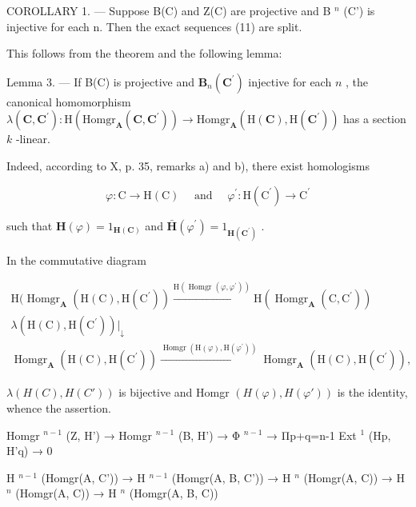 COROLLARY 1. --- Suppose B(C) and Z(C) are projective and B \(^{n}\) (C') is injective for each n. Then the exact sequences (11) are split.

This follows from the theorem and the following lemma:

Lemma 3. --- If B(C) is projective and \(\mathbf{B}_{n}(\mathbf{C}^{\prime})\) injective for each \(n\) , the canonical homomorphism \(\lambda(\mathbf{C}, \mathbf{C}^{\prime}): \mathrm{H}(\mathrm{Homgr}_{\mathbf{A}}(\mathbf{C}, \mathbf{C}^{\prime})) \to \mathrm{Homgr}_{\mathbf{A}}(\mathrm{H}(\mathbf{C}), \mathrm{H}(\mathbf{C}^{\prime}))\) has a section \(k\) -linear.

Indeed, according to X, p. 35, remarks a) and b), there exist homologisms

\[
\varphi : \mathrm{C} \rightarrow \mathrm{H} (\mathrm{C}) \quad \text { and } \quad \varphi^ {\prime}: \mathrm{H} (\mathrm{C} ^ {\prime}) \rightarrow \mathrm{C} ^ {\prime}
\]

such that \(\mathbf{H}(\varphi) = 1_{\mathbf{H}(\mathbf{C})}\) and \(\bar{\mathbf{H}} (\varphi^{\prime}) = 1_{\mathbf{H}(\mathbf{C}^{\prime})}\) .

In the commutative diagram

\[
\begin{array}{l} \mathrm{H} (\operatorname{Homgr} _ {\mathbf {A}} (\mathrm{H} (\mathrm{C}), \mathrm{H} (\mathrm{C} ^ {\prime})) \xrightarrow {\mathrm{H} (\operatorname{Homgr} (\varphi , \varphi^ {\prime}))} \mathrm{H} (\operatorname{Homgr} _ {\mathbf {A}} (\mathrm{C}, \mathrm{C} ^ {\prime})) \\ \lambda (\mathrm{H} (\mathrm{C}), \mathrm{H} (\mathrm{C} ^ {\prime})) \Big | _ {\downarrow} \\ \operatorname{Homgr} _ {\mathbf {A}} (\mathrm{H} (\mathrm{C}), \mathrm{H} (\mathrm{C} ^ {\prime})) \xrightarrow {\operatorname{Homgr} (\mathrm{H} (\varphi) , \mathrm{H} (\varphi^ {\prime}))} \operatorname{Homgr} _ {\mathbf {A}} (\mathrm{H} (\mathrm{C}), \mathrm{H} (\mathrm{C} ^ {\prime}))  , \end{array}
\]

\(\lambda(H(C), H(C'))\) is bijective and Homgr \((H(\varphi), H(\varphi'))\) is the identity, whence the assertion.

Homgr \(^{n-1}\) (Z, H') → Homgr \(^{n-1}\) (B, H') → Φ \(^{n-1}\) → Πp+q=n-1 Ext \(^{1}\) (Hp, H'q) → 0

H \(^{n-1}\) (Homgr(A, C')) → H \(^{n-1}\) (Homgr(A, B, C')) → H \(^{n}\) (Homgr(A, C)) → H \(^{n}\) (Homgr(A, C)) → H \(^{n}\) (Homgr(A, B, C))


